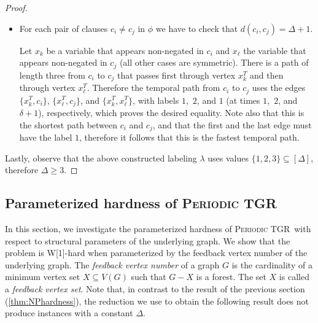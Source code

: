 \documentclass[a4paper,UKenglish,cleveref, autoref, thm-restate, anonymous]{lipics-v2021}
\newcommand{\deltaExact}{\textsc{Periodic TGR}}
\begin{document}
\begin{proof}
\begin{itemize}
    \item For each pair of clauses $c_i \neq c_j$ in $\phi$ we have to check that
    $d(c_i,c_j)= \Delta + 1$.

    Let $x_k$ be a variable that appears non-negated in $c_i$
    and $x_\ell$ the variable that appears non-negated in $c_j$
    (all other cases are symmetric).
    There is a path of length three from $c_i$ to $c_j$
    that passes first through vertex $x_k^T$ and then through vertex $x_\ell^T$.
    Therefore the temporal path from $c_i$ to $c_j$
    uses the edges $\{x_k^T, c_i\}$, $\{x_\ell^T, c_j\}$, and $\{x_k^T, x_\ell ^T\}$, with labels $1$,~$2$, and $1$ (at times $1$,~$2$, and $\delta + 1$), respectively,
    which proves the desired equality.
    Note also that this is the shortest path between $c_i$ and $c_j$, and that the first and the last edge must have the label $1$,
    therefore it follows that this is the fastest temporal path.
\end{itemize}
Lastly, observe that the above constructed labeling $\lambda$ uses values $\{1,2,3\}\subseteq[\Delta]$, therefore $\Delta\ge 3$.
\end{proof}


\subsection{Parameterized hardness of \deltaExact}\label{sec:w1hardness}

In this section, we investigate the parameterized hardness of \deltaExact\ with respect to structural parameters of the underlying graph. We show that the problem is W[1]-hard when parameterized by the feedback vertex number of the underlying graph. The \emph{feedback vertex number} of a graph $G$ is the cardinality of a minimum vertex set $X\subseteq V(G)$ such that $G-X$ is a forest. The set $X$ is called a \emph{feedback vertex set}. 
Note that, in contrast to the result of the previous section (\cref{thm:NPhardness}), the reduction we use to obtain the following result does not produce instances with a constant $\Delta$.
\end{document}
